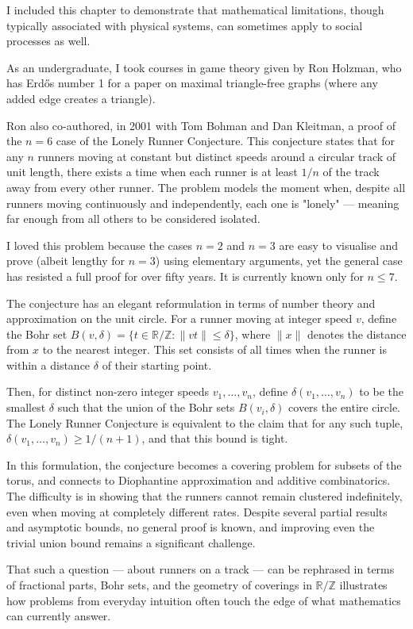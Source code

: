 \begin{commentary}
I included this chapter to demonstrate that mathematical limitations, though typically associated with physical systems, can sometimes apply to social processes as well.

As an undergraduate, I took courses in game theory given by Ron Holzman, who has Erdős number 1 for a paper on maximal triangle-free graphs (where any added edge creates a triangle).

Ron also co-authored, in 2001 with Tom Bohman and Dan Kleitman, a proof of the $n = 6$ case of the Lonely Runner Conjecture. This conjecture states that for any $n$ runners moving at constant but distinct speeds around a circular track of unit length, there exists a time when each runner is at least $1/n$ of the track away from every other runner. The problem models the moment when, despite all runners moving continuously and independently, each one is "lonely" — meaning far enough from all others to be considered isolated.

I loved this problem because the cases $n = 2$ and $n = 3$ are easy to visualise and prove (albeit lengthy for $n = 3$) using elementary arguments, yet the general case has resisted a full proof for over fifty years. It is currently known only for $n \leq 7$.

The conjecture has an elegant reformulation in terms of number theory and approximation on the unit circle. For a runner moving at integer speed $v$, define the Bohr set $B(v,\delta) = \{ t \in \mathbb{R}/\mathbb{Z} : \|vt\| \leq \delta \}$, where $\|x\|$ denotes the distance from $x$ to the nearest integer. This set consists of all times when the runner is within a distance $\delta$ of their starting point.

Then, for distinct non-zero integer speeds $v_1, \dots, v_n$, define $\delta(v_1, \dots, v_n)$ to be the smallest $\delta$ such that the union of the Bohr sets $B(v_i, \delta)$ covers the entire circle. The Lonely Runner Conjecture is equivalent to the claim that for any such tuple, $\delta(v_1, \dots, v_n) \geq 1/(n+1)$, and that this bound is tight.

In this formulation, the conjecture becomes a covering problem for subsets of the torus, and connects to Diophantine approximation and additive combinatorics. The difficulty is in showing that the runners cannot remain clustered indefinitely, even when moving at completely different rates. Despite several partial results and asymptotic bounds, no general proof is known, and improving even the trivial union bound remains a significant challenge.

That such a question — about runners on a track — can be rephrased in terms of fractional parts, Bohr sets, and the geometry of coverings in $\mathbb{R}/\mathbb{Z}$ illustrates how problems from everyday intuition often touch the edge of what mathematics can currently answer.
\end{commentary}


